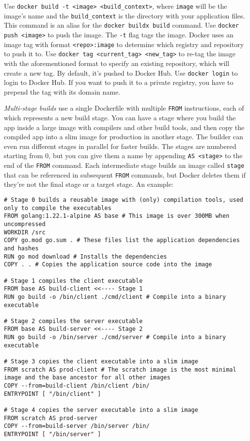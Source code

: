 \documentclass[8pt, table, xcdraw]{article}%
\begin{document}
Use \lstinline{docker build -t <image> <build_context>}, where \lstinline{image} will be the image's name and the \lstinline{build_context} is the directory with your application files. This command is an alias for the \lstinline{docker buildx build} command. Use \lstinline{docker push <image>} to push the image. The \lstinline{-t} flag tags the image. Docker uses an image tag with format \lstinline{<repo>:image} to determine which registry and repository to push it to. Use \lstinline{docker tag <current_tag> <new_tag>} to re-tag the image with the aforementioned format to specify an existing repository, which will create a new tag. By default, it's pushed to Docker Hub. Use \lstinline{docker login} to login to Docker Hub. If you want to push it to a private registry, you have to prepend the tag with its domain name.

\emph{Multi-stage builds} use a single Dockerfile with multiple \lstinline{FROM} instructions, each of which represents a new build stage. You can have a stage where you build the app inside a large image with compilers and other build tools, and then copy the compiled app into a slim image for production in another stage. The builder can even run different stages in parallel for faster builds. The stages are numbered starting from 0, but you can give them a name by appending \lstinline{AS <stage>} to the end of the \lstinline{FROM} command. Each intermediate stage builds an image called \lstinline{stage} that can be referenced in subsequent \lstinline{FROM} commands, but Docker deletes them if they're not the final stage or a target stage. An example:

\begin{lstlisting}
# Stage 0 builds a reusable image with (only) compilation tools, used only to compile the executables
FROM golang:1.22.1-alpine AS base # This image is over 300MB when uncompressed
WORKDIR /src
COPY go.mod go.sum . # These files list the application dependencies and hashes
RUN go mod download # Installs the dependencies
COPY . . # Copies the application source code into the image

# Stage 1 compiles the client executable
FROM base AS build-client <<---- Stage 1
RUN go build -o /bin/client ./cmd/client # Compile into a binary executable

# Stage 2 compiles the server executable
FROM base AS build-server <<---- Stage 2
RUN go build -o /bin/server ./cmd/server # Compile into a binary executable

# Stage 3 copies the client executable into a slim image
FROM scratch AS prod-client # The scratch image is the most minimal image and the base ancestor for all other images
COPY --from=build-client /bin/client /bin/
ENTRYPOINT [ "/bin/client" ]

# Stage 4 copies the server executable into a slim image
FROM scratch AS prod-server
COPY --from=build-server /bin/server /bin/
ENTRYPOINT [ "/bin/server" ]
\end{lstlisting}
\end{document}

